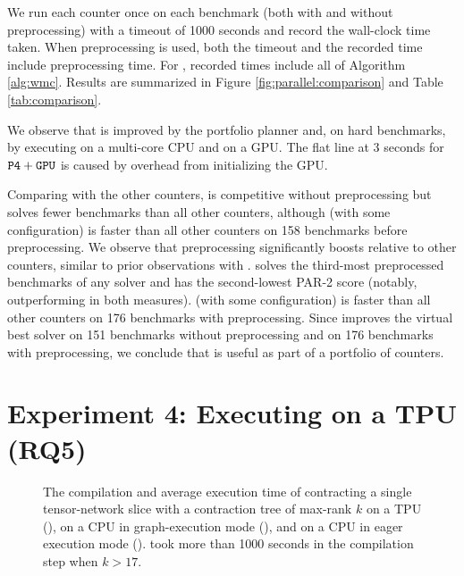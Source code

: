 We run each counter once on each benchmark (both with and without  preprocessing) with a timeout of 1000 seconds and record the wall-clock time taken. When preprocessing is used, both the timeout and the recorded time include preprocessing time. For , recorded times include all of Algorithm \ref{alg:wmc}. Results are summarized in Figure \ref{fig:parallel:comparison} and Table \ref{tab:comparison}. 

We observe that  is improved by the portfolio planner and, on hard benchmarks, by executing on a multi-core CPU and on a GPU. The flat line at 3 seconds for $\texttt{\upshape P4}+\texttt{\upshape GPU}$ is caused by overhead from initializing the GPU.

Comparing  with the other counters,  is competitive without preprocessing but solves fewer benchmarks than all other counters, although  (with some configuration) is faster than all other counters on 158 benchmarks before preprocessing. 
We observe that preprocessing significantly boosts  relative to other counters, similar to prior observations with  \cite{FHZ19}.  solves the third-most preprocessed benchmarks of any solver and has the second-lowest PAR-2 score (notably, outperforming  in both measures).  (with some configuration) is faster than all other counters on 176 benchmarks with preprocessing. Since  improves the virtual best solver on 151 benchmarks without preprocessing and on 176 benchmarks with preprocessing, we conclude that  is useful as part of a portfolio of counters.

\section{Experiment 4: Executing on a TPU (RQ5)}
\label{sec:parallel:exp:tpu}
\begin{figure}[t]
\begin{center}

%
\vspace*{-0.9cm}
\caption{\label{fig:parallel:tpu} The compilation and average execution time of contracting a single tensor-network slice with a contraction tree of max-rank $k$ on a TPU (), on a CPU in graph-execution mode (), and on a CPU in eager execution mode ().  took more than 1000 seconds in the compilation step when $k > 17$.}
\end{center}
\vspace*{-0.8cm}
\end{figure}


